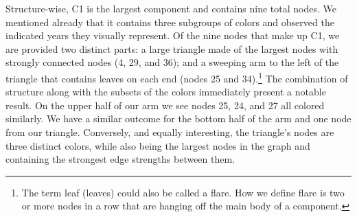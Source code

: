 \documentclass[10pt, letterpaper]{article}
\begin{document}
Structure-wise, C1 is the largest component and contains nine total
nodes. We mentioned already that it contains three subgroups of colors
and observed the indicated years they visually represent. Of the nine
nodes that make up C1, we are provided two distinct parts: a large
triangle made of the largest nodes with strongly connected nodes (4, 29,
and 36); and a sweeping arm to the left of the triangle that contains
leaves on each end (nodes 25 and
34).\footnote{The term leaf (leaves) could also be called a flare. How we define flare is two or more nodes in a row that are hanging off the main body of a component.}
The combination of structure along with the subsets of the colors
immediately present a notable result. On the upper half of our arm we
see nodes 25, 24, and 27 all colored similarly. We have a similar
outcome for the bottom half of the arm and one node from our triangle.
Conversely, and equally interesting, the triangle's nodes are three
distinct colors, while also being the largest nodes in the graph and
containing the strongest edge strengths between them.
\end{document}
